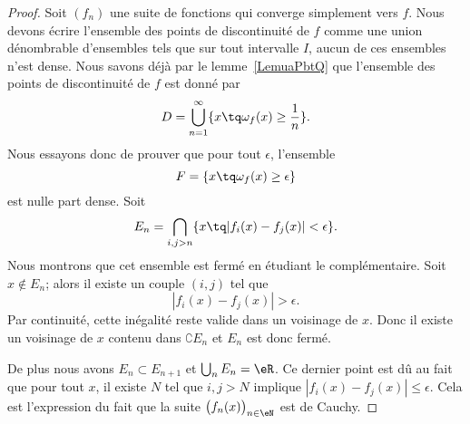 \begin{proof}
	Soit \( (f_n)\) une suite de fonctions qui converge simplement vers \( f\). Nous devons écrire l'ensemble des points de discontinuité de \( f\) comme une union dénombrable d'ensembles tels que sur tout intervalle \( I\), aucun de ces ensembles n'est dense. Nous savons déjà par le lemme~\ref{LemuaPbtQ} que l'ensemble des points de discontinuité  de \( f\) est donné par
	\begin{equation}
		D=\bigcup_{n=1}^{\infty}\{ x\tq \omega_f(x)\geq \frac{1}{  n } \}.
	\end{equation}
	Nous essayons donc de prouver que pour tout \( \epsilon\), l'ensemble
	\begin{equation}
		F=\{ x\tq \omega_f(x)\geq \epsilon \}
	\end{equation}
	est nulle part dense. Soit
	\begin{equation}
		E_n=\bigcap_{i,j>n}\{ x\tq | f_i(x)-f_j(x) |<\epsilon \}.
	\end{equation}
	Nous montrons que cet ensemble est fermé en étudiant le complémentaire. Soit \( x\notin E_n\); alors il existe un couple \( (i,j)\) tel que
	\begin{equation}
		| f_i(x)-f_j(x) |>\epsilon.
	\end{equation}
	Par continuité, cette inégalité reste valide dans un voisinage de \( x\). Donc il existe un voisinage de \( x\) contenu dans \( \complement E_n\) et \( E_n\) est donc fermé.

	De plus nous avons \( E_n\subset E_{n+1}\) et \( \bigcup_nE_n=\eR\). Ce dernier point est dû au fait que pour tout \( x\), il existe \( N\) tel que \( i,j>N\) implique \( | f_i(x)-f_j(x) |\leq \epsilon\). Cela est l'expression du fait que la suite \( \big( f_n(x) \big)_{n\in \eN}\) est de Cauchy.


\end{proof}
